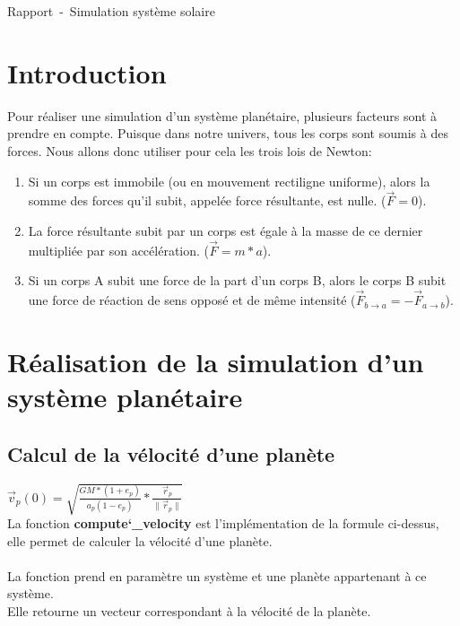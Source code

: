 \documentclass[a4paper,10pt]{article}
\title{\doctitle}
\author{\docauthor}
\date{\docdate}
\newcommand{\doctitle}{Rapport}
\newcommand{\docsubtitle}{Simulation système solaire}
\begin{document}
    \begin{center}
    {\huge \doctitle~-~\docsubtitle}\newline
    \end{center}

    \tableofcontents

    \newpage

    \section{Introduction}\label{sec:introduction}

    Pour réaliser une simulation d'un système planétaire, plusieurs facteurs sont à prendre en compte.
    Puisque dans notre univers, tous les corps sont soumis à des forces.
    Nous allons donc utiliser pour cela les trois lois de Newton:

    \begin{enumerate}
        \item Si un corps est immobile (ou en mouvement rectiligne uniforme), alors la somme des forces qu’il subit, appelée force résultante, est nulle. ($\vec{F} = 0$).
        \item La force résultante subit par un corps est égale à la masse de ce dernier multipliée par son accélération. ($\vec{F} = m * a$).
        \item Si un corps A subit une force de la part d’un corps B, alors le corps B subit une force de réaction de sens opposé et de même intensité ($\vec{F}_{b\to{a}} = -\vec{F}_{a\to{b}}$).
    \end{enumerate}
    
    \section{Réalisation de la simulation d'un système planétaire}\label{sec:réalisation-de-la-simulation-d'un-système-planétaire}

    \subsection{Calcul de la vélocité d'une planète}\label{subsec:calcul-de-la-vélocité-d'une-planète}

    $\vec{v}_{p}(0) = \sqrt{\frac{GM * (1 + e_{p})}{a_{p}(1 - e_{p})} * \frac{\vec{r}_{p}}{\|\vec{r}_{p}\|}}$\\

    La fonction \textbf{compute\char`_velocity} est l'implémentation de la formule ci-dessus, elle permet de calculer la vélocité d'une planète. \\\\
    La fonction prend en paramètre un système et une planète appartenant à ce système.\\
    Elle retourne un vecteur correspondant à la vélocité de la planète.
\end{document}
